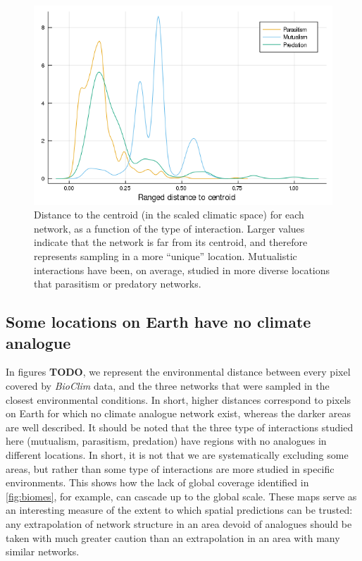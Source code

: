 \begin{figure}
\hypertarget{fig:ecc}{%
\centering
\includegraphics{figures/figure_05_b.png}
\caption{Distance to the centroid (in the scaled climatic space) for
each network, as a function of the type of interaction. Larger values
indicate that the network is far from its centroid, and therefore
represents sampling in a more ``unique'' location. Mutualistic
interactions have been, on average, studied in more diverse locations
that parasitism or predatory networks.}\label{fig:ecc}
}
\end{figure}

\hypertarget{some-locations-on-earth-have-no-climate-analogue}{%
\subsection{Some locations on Earth have no climate
analogue}\label{some-locations-on-earth-have-no-climate-analogue}}

In figures \textbf{TODO}, we represent the environmental distance
between every pixel covered by \emph{BioClim} data, and the three
networks that were sampled in the closest environmental conditions. In
short, higher distances correspond to pixels on Earth for which no
climate analogue network exist, whereas the darker areas are well
described. It should be noted that the three type of interactions
studied here (mutualism, parasitism, predation) have regions with no
analogues in different locations. In short, it is not that we are
systematically excluding some areas, but rather than some type of
interactions are more studied in specific environments. This shows how
the lack of global coverage identified in \cref{fig:biomes}, for
example, can cascade up to the global scale. These maps serve as an
interesting measure of the extent to which spatial predictions can be
trusted: any extrapolation of network structure in an area devoid of
analogues should be taken with much greater caution than an
extrapolation in an area with many similar networks.


